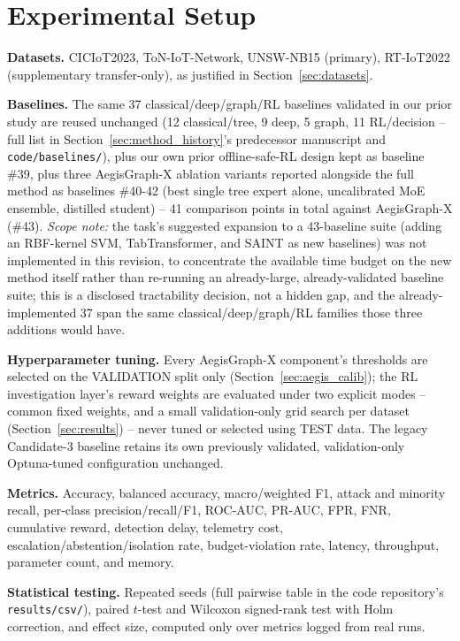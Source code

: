 \documentclass[journal]{IEEEtran}
\begin{document}
\section{Experimental Setup}
\label{sec:setup}

\textbf{Datasets.} CICIoT2023, ToN-IoT-Network, UNSW-NB15 (primary),
RT-IoT2022 (supplementary transfer-only), as justified in
Section~\ref{sec:datasets}.

\textbf{Baselines.} The same 37 classical/deep/graph/RL baselines validated in
our prior study are reused unchanged (12 classical/tree, 9 deep, 5 graph, 11
RL/decision -- full list in Section~\ref{sec:method_history}'s predecessor
manuscript and \texttt{code/baselines/}), plus our own prior offline-safe-RL
design kept as baseline \#39, plus three AegisGraph-X ablation variants
reported alongside the full method as baselines \#40-42 (best single tree
expert alone, uncalibrated MoE ensemble, distilled student) -- 41 comparison
points in total against AegisGraph-X (\#43). \emph{Scope note:} the task's
suggested expansion to a 43-baseline suite (adding an RBF-kernel SVM,
TabTransformer, and SAINT as new baselines) was not implemented in this
revision, to concentrate the available time budget on the new method itself
rather than re-running an already-large, already-validated baseline suite;
this is a disclosed tractability decision, not a hidden gap, and the
already-implemented 37 span the same classical/deep/graph/RL families those
three additions would have.

\textbf{Hyperparameter tuning.} Every AegisGraph-X component's thresholds are
selected on the VALIDATION split only (Section~\ref{sec:aegis_calib}); the
RL investigation layer's reward weights are evaluated under two explicit
modes -- common fixed weights, and a small validation-only grid search per
dataset (Section~\ref{sec:results}) -- never tuned or selected using TEST
data. The legacy Candidate-3 baseline retains its own previously validated,
validation-only Optuna-tuned configuration unchanged.

\textbf{Metrics.} Accuracy, balanced accuracy, macro/weighted F1, attack and
minority recall, per-class precision/recall/F1, ROC-AUC, PR-AUC, FPR, FNR,
cumulative reward, detection delay, telemetry cost, escalation/abstention/isolation
rate, budget-violation rate, latency, throughput, parameter count, and memory.

\textbf{Statistical testing.} Repeated seeds (full pairwise table in the
code repository's \texttt{results/csv/}), paired $t$-test and Wilcoxon
signed-rank test with Holm correction, and effect
size, computed only over metrics logged from real runs.
\end{document}
